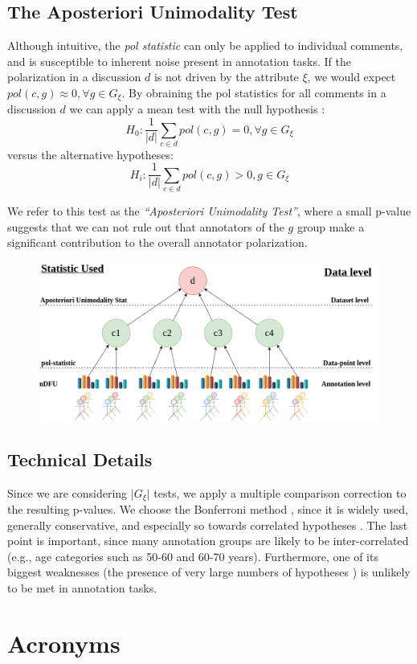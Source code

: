 \documentclass{article}
\begin{document}
\subsection{The Aposteriori Unimodality Test}
\label{ssec:methodology:aposteriori}

Although intuitive, the \textit{pol statistic} can only be applied to individual comments, and is susceptible to inherent noise present in annotation tasks. If the polarization in a discussion $d$ is not driven by the attribute $\xi$, we would expect $pol(c, g) \approx 0,  \forall g \in G_{\xi}$. By obraining the pol statistics for all comments in a discussion $d$ we can apply a mean test with the null hypothesis :
\begin{equation}
	H_0: \frac{1}{\lvert d \rvert} \sum\limits_{c \in d} pol(c, g) = 0, \forall g \in G_{\xi}
\end{equation}
\noindent versus the alternative hypotheses: 
\begin{equation}
	H_i:  \frac{1}{\lvert d \rvert} \sum\limits_{c \in d}  pol(c, g) > 0, g \in G_{\xi}
\end{equation}

We refer to this test as the \textit{``Aposteriori Unimodality Test''}, where a small p-value suggests that we can not rule out that annotators of the $g$ group make a significant contribution to the overall annotator polarization.

\begin{figure}
	\includegraphics{overview.png}
	\caption{}
\end{figure}


\subsection{Technical Details}

Since we are considering $\lvert G_{\xi} \rvert$ tests, we apply a multiple comparison correction to the resulting p-values. We choose the Bonferroni method \parencite{Bland170}, since it is widely used, generally conservative, and especially so towards correlated hypotheses \parencite{ChenFengYi2017}. The last point is important, since many annotation groups are likely to be inter-correlated (e.g., age categories such as 50-60 and 60-70 years). Furthermore, one of its biggest weaknesses (the presence of very large numbers of hypotheses \parencite{ChenFengYi2017}) is unlikely to be met in annotation tasks.


\section{Acronyms}

\begin{acronym}[WWW]
\end{acronym}

\printbibliography
\end{document}
